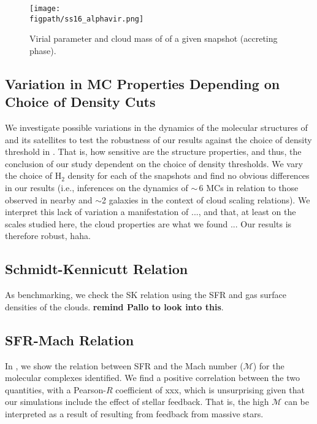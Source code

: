 \documentclass[apj]{emulateapj} %
\begin{document}
\begin{figure*}[htbp]
\centering
\texttt{[image: \\figpath/ss16\_alphavir.png]}  
\caption{
Virial parameter and cloud mass of \flower of a given snapshot (accreting phase).
\label{fig:alpha16}}
\end{figure*}









\subsection{Variation in MC Properties Depending on Choice of Density Cuts}	 \label{sec:ncut}
We investigate possible variations in the dynamics of the molecular structures of \flower and its satellites 
to test 
the robustness of our results against the choice of density threshold in .
That is, how sensitive are the structure properties, and thus, the conclusion of our study
dependent on the choice of density thresholds.
We vary the choice of H$_2$ density for each of the snapshots and 
find no obvious differences in our results (i.e., inferences on the dynamics of \z$\sim$\,6 
MCs in relation to those observed in nearby and \z$\sim$2 galaxies in the context of 
cloud scaling relations).
We interpret this lack of variation a manifestation of ..., and that, at least on the scales studied here, the cloud properties are what we found ... 
Our results is therefore robust, haha.




\subsection{Schmidt-Kennicutt Relation}
As benchmarking, we check the SK relation using the SFR and gas surface densities of the clouds. {\bf remind Pallo to look into this}.


\subsection{SFR-Mach Relation}
In \Fig{}, we show the relation between SFR and the Mach number ($\mathcal{M}$) for the molecular 
complexes identified. 
We find a positive correlation between the two quantities, with a Pearson-$R$ coefficient of xxx, 
which is unsurprising given that our simulations include the effect of stellar feedback. That is, 
the high $\mathcal{M}$ can be interpreted as a result of \SF resulting from feedback from 
massive stars.
\end{document}
